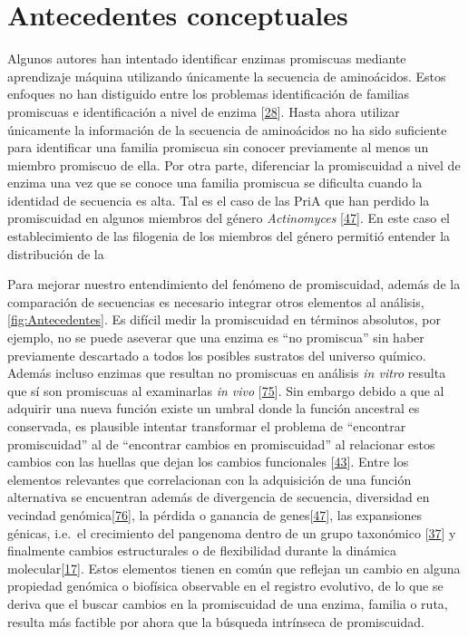 \documentclass[12pt,twoside]{reedthesis}
\begin{document}
  \section{Antecedentes conceptuales}\label{antecedentes-conceptuales}
  
  Algunos autores han intentado identificar enzimas promiscuas mediante
  aprendizaje máquina utilizando únicamente la secuencia de aminoácidos.
  Estos enfoques no han distiguido entre los problemas identificación de
  familias promiscuas e identificación a nivel de enzima
  {[}\protect\hyperlink{ref-carbonell_molecular_2010}{28}{]}. Hasta ahora
  utilizar únicamente la información de la secuencia de aminoácidos no ha
  sido suficiente para identificar una familia promiscua sin conocer
  previamente al menos un miembro promiscuo de ella. Por otra parte,
  diferenciar la promiscuidad a nivel de enzima una vez que se conoce una
  familia promiscua se dificulta cuando la identidad de secuencia es alta.
  Tal es el caso de las PriA que han perdido la promiscuidad en algunos
  miembros del género \emph{Actinomyces}
  {[}\protect\hyperlink{ref-juarez-vazquez_evolution_2017}{47}{]}. En este
  caso el establecimiento de las filogenia de los miembros del género
  permitió entender la distribución de la
  
  Para mejorar nuestro entendimiento del fenómeno de promiscuidad, además
  de la comparación de secuencias es necesario integrar otros elementos al
  análisis,\autoref{fig:Antecedentes}. Es difícil medir la promiscuidad en
  términos absolutos, por ejemplo, no se puede aseverar que una enzima es
  ``no promiscua'' sin haber previamente descartado a todos los posibles
  sustratos del universo químico. Además incluso enzimas que resultan no
  promiscuas en análisis \emph{in vitro} resulta que sí son promiscuas al
  examinarlas \emph{in vivo}
  {[}\protect\hyperlink{ref-noda_tesis_2012}{75}{]}. Sin embargo debido a
  que al adquirir una nueva función existe un umbral donde la función
  ancestral es conservada, es plausible intentar transformar el problema
  de ``encontrar promiscuidad'' al de ``encontrar cambios en
  promiscuidad'' al relacionar estos cambios con las huellas que dejan los
  cambios funcionales
  {[}\protect\hyperlink{ref-soskine_mutational_2010}{43}{]}. Entre los
  elementos relevantes que correlacionan con la adquisición de una función
  alternativa se encuentran además de divergencia de secuencia, diversidad
  en vecindad
  genómica{[}\protect\hyperlink{ref-zhao__function_prediction_neighbourhood_2014}{76}{]},
  la pérdida o ganancia de
  genes{[}\protect\hyperlink{ref-juarez-vazquez_evolution_2017}{47}{]},
  las expansiones génicas, i.e.~el crecimiento del pangenoma dentro de un
  grupo taxonómico
  {[}\protect\hyperlink{ref-martinez-nunez_lifestyle_2015}{37}{]} y
  finalmente cambios estructurales o de flexibilidad durante la dinámica
  molecular{[}\protect\hyperlink{ref-zou_evolution_2015}{17}{]}. Estos
  elementos tienen en común que reflejan un cambio en alguna propiedad
  genómica o biofísica observable en el registro evolutivo, de lo que se
  deriva que el buscar cambios en la promiscuidad de una enzima, familia o
  ruta, resulta más factible por ahora que la búsqueda intrínseca de
  promiscuidad.
  
\end{document}
